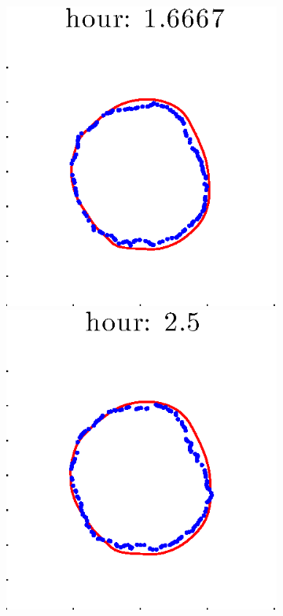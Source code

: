 \documentclass[12pt]{article}
\begin{document}
\begin{figure}[h!]
\begin{subfigure}[b]{.3\textwidth}
		\includegraphics[height=.15\textheight]{Pos0/firsthalf/second3.eps}
		\includegraphics[height=.15\textheight]{Pos0/firsthalf/second4.eps}

\end{subfigure}
\end{figure}
\end{document}
